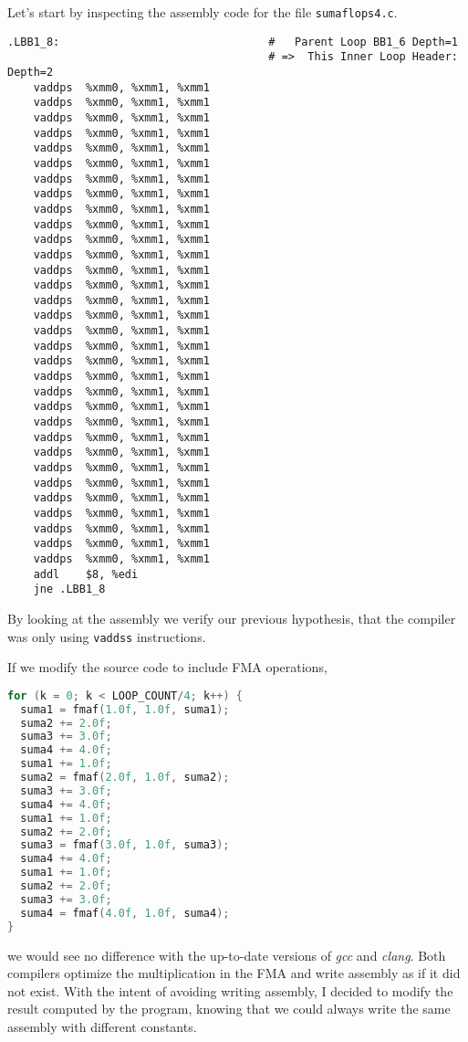 \documentclass[
    12pt, %
]{fphw}
\newcommand{\tech}{\texttt}
\newcommand{\gcc}{\textit{gcc}}
\newcommand{\clang}{\textit{clang}}
\begin{document}
\noindent
Let's start by inspecting the assembly code for the file \tech{sumaflops4.c}.

\begin{lstlisting}
.LBB1_8:                                #   Parent Loop BB1_6 Depth=1
                                        # =>  This Inner Loop Header: Depth=2
	vaddps	%xmm0, %xmm1, %xmm1
	vaddps	%xmm0, %xmm1, %xmm1
	vaddps	%xmm0, %xmm1, %xmm1
	vaddps	%xmm0, %xmm1, %xmm1
	vaddps	%xmm0, %xmm1, %xmm1
	vaddps	%xmm0, %xmm1, %xmm1
	vaddps	%xmm0, %xmm1, %xmm1
	vaddps	%xmm0, %xmm1, %xmm1
	vaddps	%xmm0, %xmm1, %xmm1
	vaddps	%xmm0, %xmm1, %xmm1
	vaddps	%xmm0, %xmm1, %xmm1
	vaddps	%xmm0, %xmm1, %xmm1
	vaddps	%xmm0, %xmm1, %xmm1
	vaddps	%xmm0, %xmm1, %xmm1
	vaddps	%xmm0, %xmm1, %xmm1
	vaddps	%xmm0, %xmm1, %xmm1
	vaddps	%xmm0, %xmm1, %xmm1
	vaddps	%xmm0, %xmm1, %xmm1
	vaddps	%xmm0, %xmm1, %xmm1
	vaddps	%xmm0, %xmm1, %xmm1
	vaddps	%xmm0, %xmm1, %xmm1
	vaddps	%xmm0, %xmm1, %xmm1
	vaddps	%xmm0, %xmm1, %xmm1
	vaddps	%xmm0, %xmm1, %xmm1
	vaddps	%xmm0, %xmm1, %xmm1
	vaddps	%xmm0, %xmm1, %xmm1
	vaddps	%xmm0, %xmm1, %xmm1
	vaddps	%xmm0, %xmm1, %xmm1
	vaddps	%xmm0, %xmm1, %xmm1
	vaddps	%xmm0, %xmm1, %xmm1
	vaddps	%xmm0, %xmm1, %xmm1
	vaddps	%xmm0, %xmm1, %xmm1
	addl	$8, %edi
	jne	.LBB1_8
\end{lstlisting}

\noindent
By looking at the assembly we verify our previous hypothesis,
that the compiler was only using \tech{vaddss} instructions.

\noindent
If we modify the source code to include FMA operations,

\begin{lstlisting}[language=C]
for (k = 0; k < LOOP_COUNT/4; k++) {
  suma1 = fmaf(1.0f, 1.0f, suma1);
  suma2 += 2.0f;
  suma3 += 3.0f;
  suma4 += 4.0f;
  suma1 += 1.0f;
  suma2 = fmaf(2.0f, 1.0f, suma2);
  suma3 += 3.0f;
  suma4 += 4.0f;
  suma1 += 1.0f;
  suma2 += 2.0f;
  suma3 = fmaf(3.0f, 1.0f, suma3);
  suma4 += 4.0f;
  suma1 += 1.0f;
  suma2 += 2.0f;
  suma3 += 3.0f;
  suma4 = fmaf(4.0f, 1.0f, suma4);
}
\end{lstlisting}

\noindent
we would see no difference with the up-to-date versions of
\gcc{} and \clang{}.
Both compilers optimize the multiplication in the FMA and
write assembly as if it did not exist.
With the intent of avoiding writing assembly,
I decided to modify the result computed by the program,
knowing that we could always write the same assembly with different constants.
\end{document}
